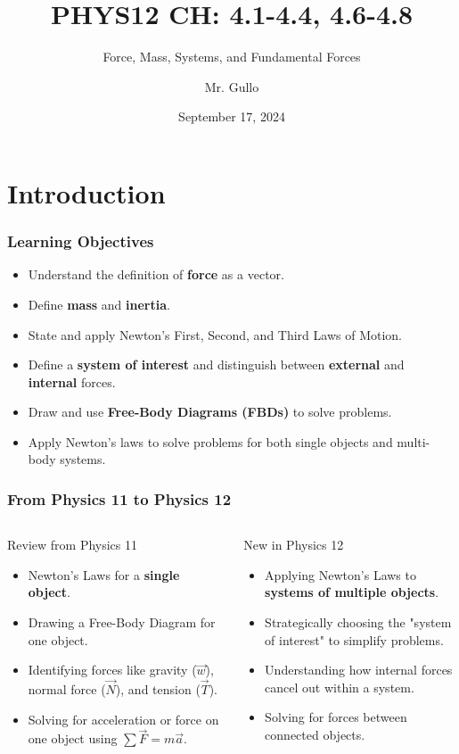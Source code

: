 \documentclass{beamer}
\title[Newton's Laws and Systems]{PHYS12 CH: 4.1-4.4, 4.6-4.8}
\subtitle{Force, Mass, Systems, and Fundamental Forces}
\author[Mr. Gullo]{Mr. Gullo}
\date[Sep 2024]{September 17, 2024}
\begin{document}
\frame{\titlepage}

\section{Introduction}

\begin{frame}
\frametitle{Learning Objectives}
\begin{itemize}
    \item Understand the definition of \textbf{force} as a vector. \pause
    \item Define \textbf{mass} and \textbf{inertia}. \pause
    \item State and apply Newton's First, Second, and Third Laws of Motion. \pause
    \item Define a \textbf{system of interest} and distinguish between \textbf{external} and \textbf{internal} forces. \pause
    \item Draw and use \textbf{Free-Body Diagrams (FBDs)} to solve problems. \pause
    \item Apply Newton's laws to solve problems for both single objects and multi-body systems.
\end{itemize}
\end{frame}

\begin{frame}
\frametitle{From Physics 11 to Physics 12}
\begin{columns}[T]
\begin{alertblock}{Review from Physics 11}
\begin{itemize}
    \item Newton's Laws for a \textbf{single object}.
    \item Drawing a Free-Body Diagram for one object.
    \item Identifying forces like gravity ($\vec{w}$), normal force ($\vec{N}$), and tension ($\vec{T}$).
    \item Solving for acceleration or force on one object using $\sum \vec{F} = m\vec{a}$.
\end{itemize}
\end{alertblock}

\begin{exampleblock}{New in Physics 12}
\begin{itemize}
    \item Applying Newton's Laws to \textbf{systems of multiple objects}.
    \item Strategically choosing the "system of interest" to simplify problems.
    \item Understanding how internal forces cancel out within a system.
    \item Solving for forces between connected objects.
\end{itemize}
\end{exampleblock}
\end{columns}
\end{frame}
\end{document}

